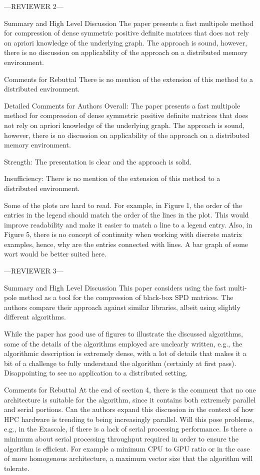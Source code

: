 ---REVIEWER 2---

Summary and High Level Discussion
The paper presents a fast multipole method for compression of dense symmetric
positive definite matrices that does not rely on apriori knowledge of the
underlying graph. The approach is sound, however, there is no discussion on
applicability of the approach on a distributed memory environment.

Comments for Rebuttal
There is no mention of the extension of this method to a distributed
environment.

Detailed Comments for Authors
Overall: The paper presents a fast multipole method for compression of dense
symmetric positive definite matrices that does not rely on apriori knowledge
of the underlying graph. The approach is sound, however, there is no
discussion on applicability of the approach on a distributed memory
environment.

Strength: The presentation is clear and the approach is solid.

Insufficiency: There is no mention of the extension of this method to a
distributed environment.

Some of the plots are hard to read. For example, in Figure 1, the order of
the entries in the legend should match the order of the lines in the plot.
This would improve readability and make it easier to match a line to a
legend entry. Also, in Figure 5, there is no concept of continuity when
working with discrete matrix examples, hence, why are the entries connected
with lines. A bar graph of some wort would be better suited here.

---REVIEWER 3---

Summary and High Level Discussion
This paper considers using the fast multi-pole method as a tool for the
compression of black-box SPD matrices. The authors compare their approach
against similar libraries, albeit using slightly different algorithms.

While the paper has good use of figures to illustrate the discussed
algorithms, some of the details of the algorithms employed are unclearly
written, e.g., the algorithmic description is extremely dense, with a lot of
details that makes it a bit of a challenge to fully understand the algorithm
(certainly at first pass). Disappointing to see no application to a
distributed setting.

Comments for Rebuttal
At the end of section 4, there is the comment that no one architecture is
suitable for the algorithm, since it contains both extremely parallel and
serial portions. Can the authors expand this discussion in the context of how
HPC hardware is trending to being increasingly parallel. Will this pose
problems, e.g., in the Exascale, if there is a lack of serial processing
performance. Is there a minimum about serial processing throughput required
in order to ensure the algorithm is efficient. For example a minimum CPU to
GPU ratio or in the case of more homogenous architecture, a maximum vector
size that the algorithm will tolerate. 

